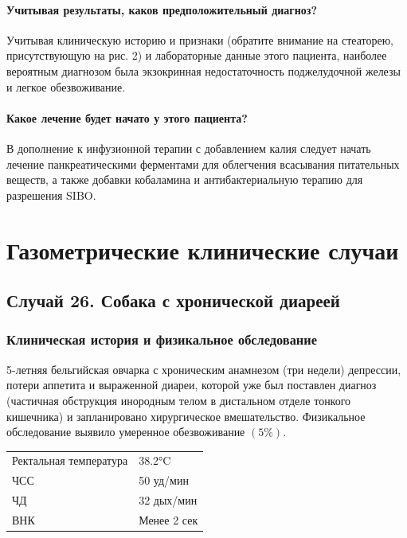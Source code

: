 \documentclass[a4paper,12pt]{book}
\begin{document}
\subsubsection*{Учитывая результаты, каков предположительный диагноз?}
Учитывая клиническую историю и признаки (обратите внимание на стеаторею, присутствующую на рис. 2) и лабораторные данные этого пациента, наиболее вероятным диагнозом была экзокринная недостаточность поджелудочной железы и легкое обезвоживание.

\subsubsection*{Какое лечение будет начато у этого пациента?}
В дополнение к инфузионной терапии с добавлением калия следует начать лечение панкреатическими ферментами для облегчения всасывания питательных веществ, а также добавки кобаламина и антибактериальную терапию для разрешения SIBO.

\chapter{Газометрические клинические случаи}
\label{chap:gas}

\section{Случай 26. Собака с хронической диареей}
\subsection*{Клиническая история и физикальное обследование}
5-летняя бельгийская овчарка с хроническим анамнезом (три недели) депрессии, потери аппетита и выраженной диареи, которой уже был поставлен диагноз (частичная обструкция инородным телом в дистальном отделе тонкого кишечника) и запланировано хирургическое вмешательство. Физикальное обследование выявило умеренное обезвоживание $(5\%)$.

\begin{tabular}{@{}ll@{}}
\toprule
Ректальная температура & 38.2°C \\
ЧСС & 50 уд/мин \\
ЧД & 32 дых/мин \\
ВНК & Менее 2 сек \\
\bottomrule
\end{tabular}
\end{document}
